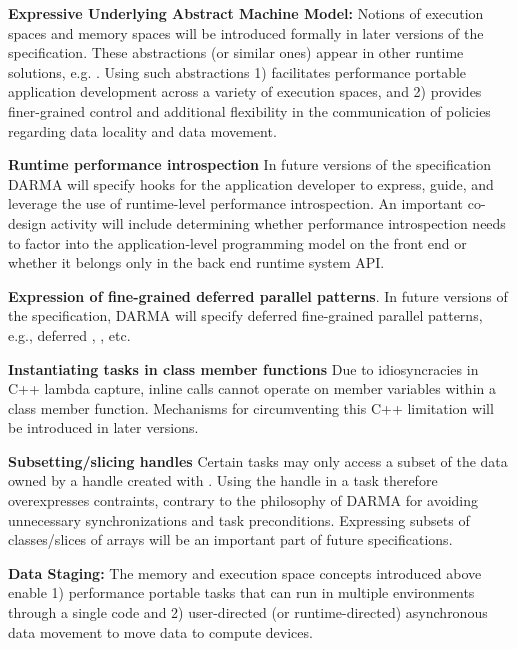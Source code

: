 \begin{compactdesc}
\item{\bf Expressive Underlying Abstract Machine Model:}
Notions of \glspl{execution space} and \glspl{memory space} will be introduced
formally in later
versions of the specification.  These abstractions (or similar ones) appear in other runtime
solutions, e.g. \cite{Kokkos, RAJA}. 
   Using such abstractions 1) facilitates performance portable application development across 
  a variety of \glspl{execution space}, and 2)
  provides finer-grained control and additional flexibility in the
  communication of policies regarding data locality and data movement. 
\item{\bf Runtime performance introspection}
  In future versions of the specification \gls{DARMA} will specify hooks for the
  application developer to express, guide, and leverage the use of runtime-level
  performance \gls{introspection}. An important \gls{co-design} activity will include determining
  whether performance \gls{introspection} needs to factor into the
  application-level \gls{programming
  model} on the \gls{front end} or whether it belongs only in the \gls{back end} 
  \gls{runtime system} \gls{API}.
\item{\bf Expression of fine-grained deferred parallel patterns}.
  In future versions of the specification, \gls{DARMA} will 
  specify deferred fine-grained parallel patterns, e.g., deferred
  , , etc.
\item{\bf Instantiating tasks in class member functions}
 Due to idiosyncracies in C++ lambda capture, inline \cwork calls cannot operate on member variables
 within a class member function. 
 Mechanisms for circumventing this C++ limitation will be introduced in later versions.
\item{\bf Subsetting/slicing handles}
 Certain tasks may only access a subset of the data owned by a handle created with .
 Using the handle in a task therefore overexpresses contraints, contrary to the philosophy of DARMA for avoiding unnecessary synchronizations and task preconditions.
 Expressing subsets of classes/slices of arrays will be an important part of future specifications.
\item {\bf Data Staging:}
The memory and execution space concepts introduced above enable 1) performance portable tasks that can run in 
multiple environments through a single code and 2) user-directed (or runtime-directed) asynchronous data movement to move data to compute devices.

\end{compactdesc}

